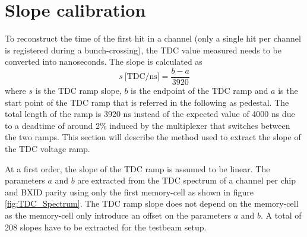 \section{Slope calibration}
\label{subsec:slope_calib}

To reconstruct the time of the first hit in a channel (only a single hit per channel is registered during a bunch-crossing), the TDC value measured needs to be converted into nanoseconds. The slope is calculated as
\begin{equation} \label{eq:slope}
	s \: \text{[TDC/ns]} = \frac{b - a}{3920}
\end{equation}
where $s$ is the TDC ramp slope, $b$ is the endpoint of the TDC ramp and $a$ is the start point of the TDC ramp that is referred in the following as pedestal. The total length of the ramp is 3920 ns instead of the expected value of 4000 ns due to a deadtime of around 2\% \cite{Brianne2012} induced by the multiplexer that switches between the two ramps. This section will describe the method used to extract the slope of the TDC voltage ramp.

At a first order, the slope of the TDC ramp is assumed to be linear. The parameters $a$ and $b$ are extracted from the TDC spectrum of a channel per chip and BXID parity using only the first memory-cell as shown in figure \ref{fig:TDC_Spectrum}. The TDC ramp slope does not depend on the memory-cell as the memory-cell only introduce an offset on the parameters $a$ and $b$. A total of 208 slopes have to be extracted for the testbeam setup.

